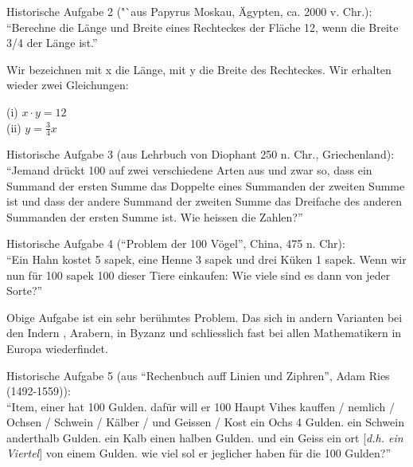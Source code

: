 \documentclass[11pt,oneside]{article}
\begin{document}
\begin{center}
	\begin{framed}
		Historische Aufgabe 2 ("`aus Papyrus Moskau, Ägypten, ca. 2000 v. Chr.):\\
		"`Berechne die Länge und Breite eines Rechteckes
		der Fläche 12, wenn die Breite 3/4 der Länge ist."'
	\end{framed}
\end{center}
Wir bezeichnen mit x die Länge, mit y die Breite des Rechteckes. Wir
erhalten wieder zwei Gleichungen:
\begin{center}
	(i) $x\cdot y=12$\\
	(ii) $y = \frac{3}{4}x$
\end{center}
\begin{center}
	\begin{framed}
		Historische Aufgabe 3 (aus Lehrbuch von Diophant 250 n. Chr., Griechenland):\\
		"`Jemand drückt 100 auf zwei verschiedene Arten aus und zwar so, dass ein Summand der ersten Summe das Doppelte eines Summanden der zweiten Summe ist und dass der andere Summand der zweiten Summe das Dreifache des anderen Summanden der ersten Summe ist. Wie heissen die Zahlen?"'
	\end{framed}
\end{center}
\begin{center}
	\begin{framed}
		Historische Aufgabe 4 ("`Problem der 100 Vögel"', China, 475 n. Chr):\\
		"`Ein Hahn kostet 5 sapek, eine Henne 3 sapek und drei Küken 1 sapek. Wenn wir nun für 100 sapek 100 dieser Tiere einkaufen: Wie viele sind es dann von jeder Sorte?"'
	\end{framed}
\end{center}
Obige Aufgabe ist ein sehr berühmtes Problem. Das sich in andern Varianten bei den Indern , Arabern, in Byzanz und schliesslich fast bei allen Mathematikern in Europa wiederfindet.
\begin{center}
	\begin{framed}
		Historische Aufgabe 5 (aus "`Rechenbuch auff Linien und Ziphren"', Adam Ries (1492-1559)):\\

		"`Item, einer hat 100 Gulden. dafür will er 100 Haupt Vihes kauffen / nemlich / Ochsen / Schwein / Kälber / und Geissen / Kost ein Ochs 4 Gulden. ein Schwein anderthalb Gulden. ein Kalb
		einen halben Gulden. und ein Geiss ein ort [\textit{d.h. ein Viertel}] von einem Gulden. wie viel sol er jeglicher haben für die 100 Gulden?"'
	\end{framed}
\end{center}
\end{document}
